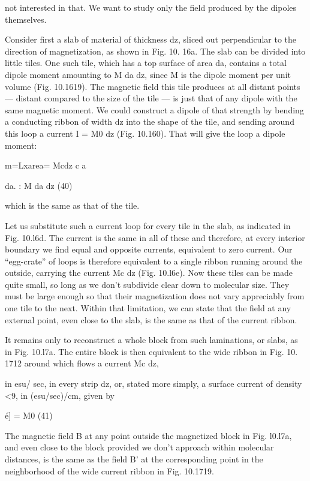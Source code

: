 not interested in that. We want to study only the field produced
by the dipoles themselves.

Consider first a slab of material of thickness dz, sliced out perpendicular
to the direction of magnetization, as shown in Fig. 10. 16a.
The slab can be divided into little tiles. One such tile, which has a
top surface of area da, contains a total dipole moment amounting to
M da dz, since M is the dipole moment per unit volume (Fig. 10.1619).
The magnetic field this tile produces at all distant points --- distant
compared to the size of the tile --- is just that of any dipole with the
same magnetic moment. We could construct a dipole of that
strength by bending a conducting ribbon of width dz into the shape
of the tile, and sending around this loop a current I = M0 dz (Fig.
10.160). That will give the loop a dipole moment:
\begin{equation}
\end{equation}

m=Lxarea= Mcdz
c a

da. : M da dz (40)

which is the same as that of the tile.

Let us substitute such a current loop for every tile in the slab, as
indicated in Fig. 10.l6d. The current is the same in all of these and
therefore, at every interior boundary we find equal and opposite
currents, equivalent to zero current. Our ``egg-crate'' of loops is
therefore equivalent to a single ribbon running around the outside,
carrying the current Mc dz (Fig. 10.l6e). Now these tiles can be
made quite small, so long as we don't subdivide clear down to molecular
size. They must be large enough so that their magnetization
does not vary appreciably from one tile to the next. Within that
limitation, we can state that the field at any external point, even close
to the slab, is the same as that of the current ribbon.

It remains only to reconstruct a whole block from such 
laminations, or slabs, as in Fig. 10.l7a. The entire block is then equivalent
to the wide ribbon in Fig. 10. 1712 around which flows a current Mc dz,

in esu/ sec, in every strip dz, or, stated more simply, a surface current
of density <9, in (esu/sec)/cm, given by
\begin{equation}
\end{equation}

é] = M0 (41)

The magnetic field B at any point outside the magnetized block in
Fig. l0.l7a, and even close to the block provided we don't approach
within molecular distances, is the same as the field B' at the corresponding
point in the neighborhood of the wide current ribbon in
Fig. 10.1719.


